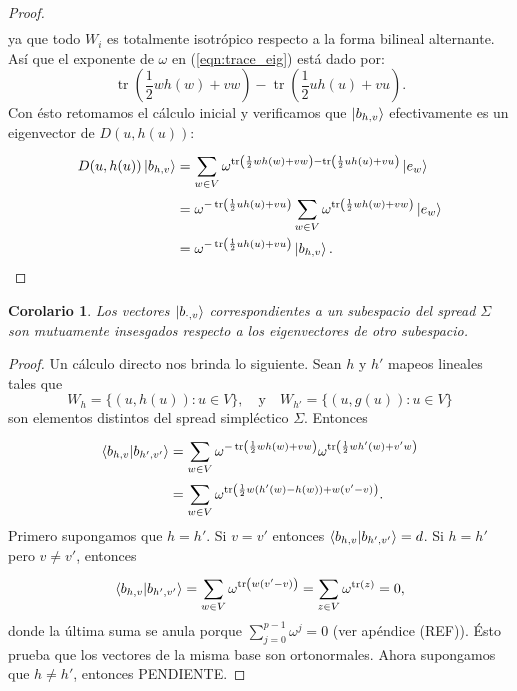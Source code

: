 \documentclass[a4paper]{report}
\DeclareMathOperator{\tr}{tr}
\newtheorem{corollary}{Corolario}
\begin{document}
\begin{proof}
\begin{align}
    \end{align}
    ya que todo $W_i$ es totalmente isotrópico respecto a la
    forma bilineal alternante. Así que el exponente de
    $\omega$ en (\ref{eqn:trace_eig}) está dado por: 
    \begin{equation}
      \tr\left( \frac{1}{2} w h(w) + v w \right)
      - \tr\left( \frac{1}{2} u h(u) + v u \right).
    \end{equation}
    Con ésto retomamos el cálculo inicial y verificamos que
    $\ket{b_{h,v}}$ efectivamente es un eigenvector de
    $D(u,h(u))$:
    \begin{align}
      D(u,h(u)) \ket{b_{h,v}}
      &= \sum_{w \in V}^{}
      \omega^{\tr\left(
          \frac{1}{2} w h(w) + v w
      \right)
      - \tr\left(
        \frac{1}{2} u h(u) + v u
      \right) } \ket{e_w} \\
      &= \omega^{-\tr\left(
          \frac{1}{2} u h(u) + v u
      \right) }
      \sum_{w \in V}^{}
      \omega^{\tr\left(
        \frac{1}{2} w h(w) + v w
      \right) } \ket{e_w} \\
      &= \omega^{-\tr\left(
        \frac{1}{2} u h(u) + v u
      \right) } \ket{b_{h,v}}.
    \end{align}
  \end{proof}
  \begin{corollary}
    Los vectores $\ket{b_{\cdot,v}}$ correspondientes a un
    subespacio del spread $\Sigma$ son mutuamente insesgados
    respecto a los eigenvectores de otro subespacio.
  \end{corollary}
  \begin{proof}
    Un cálculo directo nos brinda lo siguiente. Sean $h$ y
    $h'$ mapeos lineales tales que
    \[
      W_h
      = \{(u,h(u)) : u \in V\},
      \quad \text{y} \quad
      W_{h'}
      = \{(u,g(u)) : u \in V\}
    \] 
    son elementos distintos del spread simpléctico $\Sigma$.
    Entonces
    \begin{align}
      \braket{b_{h,v}|b_{h',v'}}
      &= \sum_{w \in V}^{} 
      \omega^{-\tr\left( \frac{1}{2} w h(w) + vw \right) }
      \omega^{\tr\left( \frac{1}{2} w h'(w) + v'w \right) } \\
      &= \sum_{w \in V}^{}
      \omega^{\tr\left( \frac{1}{2} w (h'(w) - h(w)) + w(v'
      - v) \right) }.
    \end{align}
    Primero supongamos que $h = h'$. Si $v = v'$ entonces
    $\braket{b_{h,v}|b_{h',v'}} = d$. Si $h = h'$ pero $v
    \neq v'$, entonces
    \begin{equation}
      \braket{b_{h,v}|b_{h',v'}}
      = \sum_{w \in V}^{} \omega^{\tr\left( w(v'-v) \right) }
      = \sum_{z \in V}^{} \omega^{\tr(z)}
      = 0,
    \end{equation}
    donde la última suma se anula porque $\sum_{j = 0}^{p-1}
    \omega^{j} = 0$ (ver apéndice (REF)). Ésto prueba que
    los vectores de la misma base son ortonormales. Ahora
    supongamos que $h \neq h'$, entonces PENDIENTE.
  \end{proof}
\end{document}
